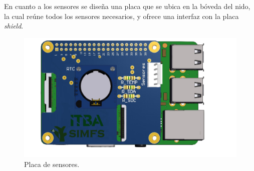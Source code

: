 En cuanto a los sensores se diseña una placa que se ubica en la bóveda del nido, la cual reúne todos los sensores necesarios, y ofrece una interfaz con la placa \textit{shield}.
\begin{figure}[H]
	\centering
	\includegraphics[width=0.6\linewidth,page=2]{ImagenesConstruccion del prototipo/shieldSensor}		
	\caption{Placa de sensores.}
	\label{fig:sens}
\end{figure}

